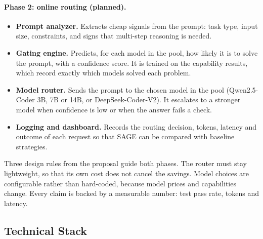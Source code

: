\paragraph{Phase 2: online routing (planned).}
\begin{itemize}[leftmargin=*]
  \item \textbf{Prompt analyzer.} Extracts cheap signals from the prompt: task type, input size, constraints, and signs that multi-step reasoning is needed.
  \item \textbf{Gating engine.} Predicts, for each model in the pool, how likely it is to solve the prompt, with a confidence score. It is trained on the capability results, which record exactly which models solved each problem.
  \item \textbf{Model router.} Sends the prompt to the chosen model in the pool (Qwen2.5-Coder 3B, 7B or 14B, or DeepSeek-Coder-V2). It escalates to a stronger model when confidence is low or when the answer fails a check.
  \item \textbf{Logging and dashboard.} Records the routing decision, tokens, latency and outcome of each request so that SAGE can be compared with baseline strategies.
\end{itemize}

Three design rules from the proposal guide both phases. The router must stay lightweight, so that its own cost does not cancel the savings. Model choices are configurable rather than hard-coded, because model prices and capabilities change. Every claim is backed by a measurable number: test pass rate, tokens and latency.

\subsection{Technical Stack}

